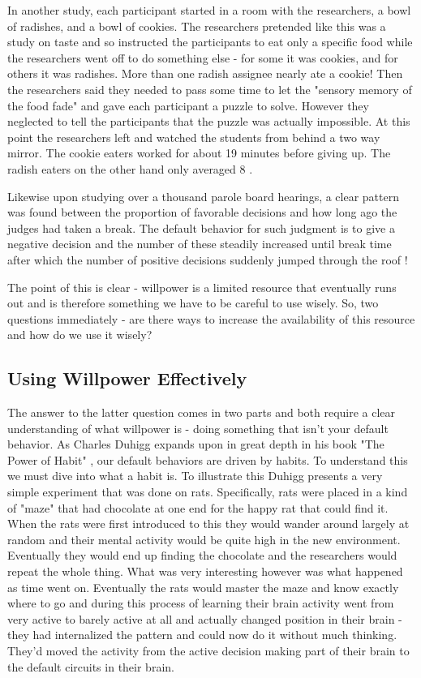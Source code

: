 \documentclass[11pt]{book}
\begin{document}
In another study, each participant started in a room with the researchers, a bowl of radishes, and a bowl of cookies. The researchers pretended like this was a study on taste and so instructed the participants to eat only a specific food while the researchers went off to do something else - for some it was cookies, and for others it was radishes. More than one radish assignee nearly ate a cookie! Then the researchers said they needed to pass some time to let the "sensory memory of the food fade" and gave each participant a puzzle to solve. However they neglected to tell the participants that the puzzle was actually impossible. At this point the researchers left and watched the students from behind a two way mirror. The cookie eaters worked for about 19 minutes before giving up. The radish eaters on the other hand only averaged 8 \cite{duhigg}.
\newline

Likewise upon studying over a thousand parole board hearings, a clear pattern was found between the proportion of favorable decisions and how long ago the judges had taken a break. The default behavior for such judgment is to give a negative decision and the number of these steadily increased until break time after which the number of positive decisions suddenly jumped through the roof \cite{keller}! 
\newline 

The point of this is clear - willpower is a limited resource that eventually runs out and is therefore something we have to be careful to use wisely. So, two questions immediately - are there ways to increase the availability of this resource and how do we use it wisely?

\subsection{Using Willpower Effectively}
The answer to the latter question comes in two parts and both require a clear understanding of what willpower is - doing something that isn't your default behavior. As Charles Duhigg expands upon in great depth in his book "The Power of Habit" \cite{duhigg}, our default behaviors are driven by habits. To understand this we must dive into what a habit is. To illustrate this Duhigg presents a very simple experiment that was done on rats. Specifically, rats were placed in a kind of "maze" that had chocolate at one end for the happy rat that could find it. When the rats were first introduced to this they would wander around largely at random and their mental activity would be quite high in the new environment. Eventually they would end up finding the chocolate and the researchers would repeat the whole thing. What was very interesting however was what happened as time went on. Eventually the rats would master the maze and know exactly where to go and during this process of learning their brain activity went from very active to barely active at all and actually changed position in their brain - they had internalized the pattern and could now do it without much thinking. They'd moved the activity from the active decision making part of their brain to the default circuits in their brain. 
\newline
\end{document}
